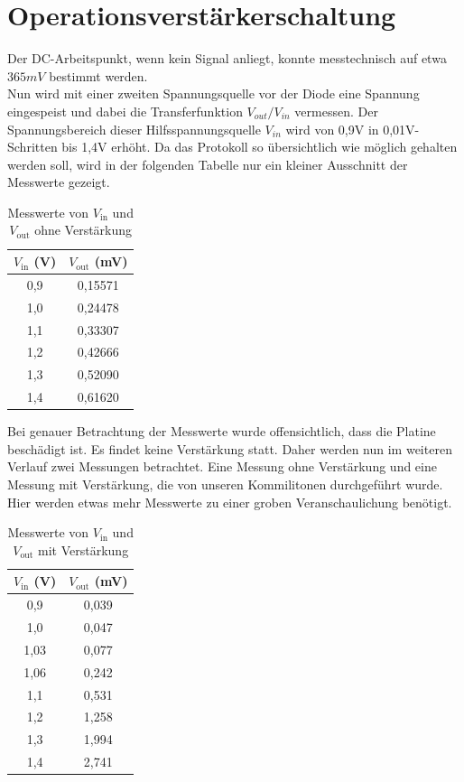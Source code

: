 \section{Operationsverstärkerschaltung} %
Der DC-Arbeitspunkt, wenn kein Signal anliegt, konnte messtechnisch auf etwa $365mV$ bestimmt werden.
\\
Nun wird mit einer zweiten Spannungsquelle vor der Diode eine Spannung eingespeist und dabei die Transferfunktion
$V_{out}/V_{in}$ vermessen. Der Spannungsbereich dieser Hilfsspannungsquelle $V_{in}$ wird von 0,9V in 0,01V-Schritten bis 1,4V erhöht.
Da das Protokoll so übersichtlich wie möglich gehalten werden soll, wird in der folgenden Tabelle nur ein kleiner Ausschnitt der
Messwerte gezeigt.
\begin{table}[h]
\centering
\begin{tabular}{|c|c|}
\hline
$V_{\text{in}}$ (V) & $V_{\text{out}}$ (mV) \\
\hline
0{,}9 & 0{,}15571 \\
1{,}0 & 0{,}24478 \\
1{,}1 & 0{,}33307 \\
1{,}2 & 0{,}42666 \\
1{,}3 & 0{,}52090 \\
1{,}4 & 0{,}61620 \\
\hline
\end{tabular}
\caption{Messwerte von $V_{\text{in}}$ und $V_{\text{out}}$ ohne Verstärkung}
\end{table}
Bei genauer Betrachtung der Messwerte wurde offensichtlich, dass die Platine beschädigt ist. Es findet keine Verstärkung
statt. Daher werden nun im weiteren Verlauf zwei Messungen betrachtet. Eine Messung ohne Verstärkung und eine Messung mit Verstärkung, die von 
unseren Kommilitonen durchgeführt wurde. Hier werden etwas mehr Messwerte zu einer groben Veranschaulichung benötigt. \\

\begin{table}[h]
\centering
\begin{tabular}{|c|c|}
\hline
$V_{\text{in}}$ (V) & $V_{\text{out}}$ (mV) \\
\hline
0{,}9 & 0{,}039 \\
1{,}0 & 0{,}047\\
1{,}03 & 0{,}077 \\
1{,}06 & 0{,}242 \\
1{,}1 & 0{,}531 \\
1{,}2 & 1{,}258 \\
1{,}3 & 1{,}994 \\
1{,}4 & 2{,}741 \\
\hline
\end{tabular}
\caption{Messwerte von $V_{\text{in}}$ und $V_{\text{out}}$ mit Verstärkung}
\end{table}

